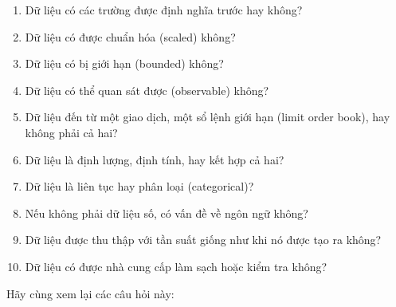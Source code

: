 \begin{enumerate}
  \item Dữ liệu có các trường được định nghĩa trước hay không?
  \item Dữ liệu có được chuẩn hóa (scaled) không?
  \item Dữ liệu có bị giới hạn (bounded) không?
  \item Dữ liệu có thể quan sát được (observable) không?
  \item Dữ liệu đến từ một giao dịch, một sổ lệnh giới hạn (limit order book), hay không phải cả hai?
  \item Dữ liệu là định lượng, định tính, hay kết hợp cả hai?
  \item Dữ liệu là liên tục hay phân loại (categorical)?
  \item Nếu không phải dữ liệu số, có vấn đề về ngôn ngữ không?
  \item Dữ liệu được thu thập với tần suất giống như khi nó được tạo ra không?
  \item Dữ liệu có được nhà cung cấp làm sạch hoặc kiểm tra không?
\end{enumerate}

Hãy cùng xem lại các câu hỏi này:

